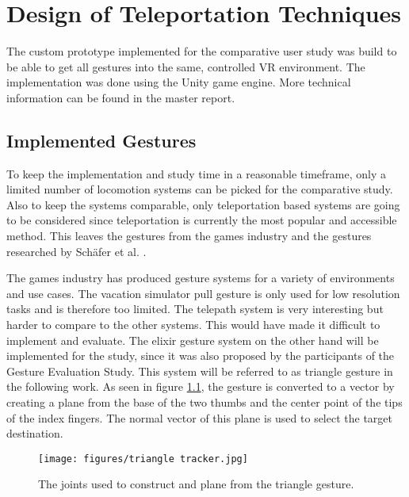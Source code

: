 \chapter{Design of Teleportation Techniques}
\label{cha:ImplementationOverview}

The custom prototype implemented for the comparative user study was build to be able to get all gestures into the same, controlled VR environment. The implementation was done using the Unity game engine. More technical information can be found in the master report. 

\section{Implemented Gestures}

To keep the implementation and study time in a reasonable timeframe, only a limited number of locomotion systems can be picked for the comparative study. Also to keep the systems comparable, only teleportation based systems are going to be considered since teleportation is currently the most popular and accessible method. This leaves the gestures from the games industry and the gestures researched by Schäfer et al. \cite{Schafer2021}. 

The games industry has produced gesture systems for a variety of environments and use cases. The vacation simulator pull gesture is only used for low resolution tasks and is therefore too limited. The telepath system is very interesting but harder to compare to the other systems. This would have made it difficult to implement and evaluate. %
The elixir gesture system on the other hand will be implemented for the study, since it was also proposed by the participants of the Gesture Evaluation Study.  %
This system will be referred to as triangle gesture in the following work. As seen in figure \ref{fig:triangleTracker}, the gesture is converted to a vector by creating a plane from the base of the two thumbs and the center point of the tips of the index fingers. The normal vector of this plane is used to select the target destination.

\begin{figure}[!ht]
    \centering
    \texttt{[image: figures/triangle tracker.jpg]}
    \caption{The joints used to construct and plane from the triangle gesture.}
    \label{fig:triangleTracker}
\end{figure}

